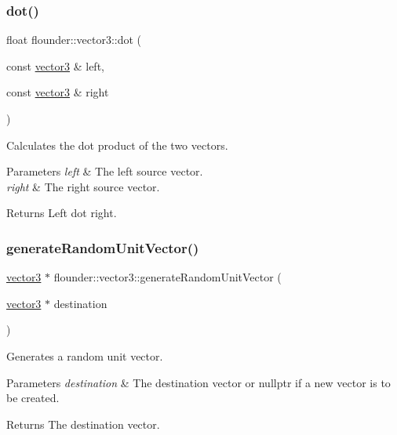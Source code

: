 \subsubsection{\texorpdfstring{dot()}{dot()}}
{\footnotesize\ttfamily float flounder\+::vector3\+::dot (\begin{DoxyParamCaption}\item[{const \hyperlink{classflounder_1_1vector3}{vector3} \&}]{left,  }\item[{const \hyperlink{classflounder_1_1vector3}{vector3} \&}]{right }\end{DoxyParamCaption})\hspace{0.3cm}{\ttfamily [static]}}



Calculates the dot product of the two vectors. 


\begin{DoxyParams}{Parameters}
{\em left} & The left source vector. \\
\hline
{\em right} & The right source vector. \\
\hline
\end{DoxyParams}
\begin{DoxyReturn}{Returns}
Left dot right. 
\end{DoxyReturn}
\mbox{\label{classflounder_1_1vector3_a6c8eeac56a831b4e3ca221e19f86031e}} 
\subsubsection{\texorpdfstring{generate\+Random\+Unit\+Vector()}{generateRandomUnitVector()}}
{\footnotesize\ttfamily \hyperlink{classflounder_1_1vector3}{vector3} $\ast$ flounder\+::vector3\+::generate\+Random\+Unit\+Vector (\begin{DoxyParamCaption}\item[{\hyperlink{classflounder_1_1vector3}{vector3} $\ast$}]{destination }\end{DoxyParamCaption})\hspace{0.3cm}{\ttfamily [static]}}



Generates a random unit vector. 


\begin{DoxyParams}{Parameters}
{\em destination} & The destination vector or nullptr if a new vector is to be created. \\
\hline
\end{DoxyParams}
\begin{DoxyReturn}{Returns}
The destination vector. 
\end{DoxyReturn}
\mbox{\label{classflounder_1_1vector3_a84374d3a1d99b2bcdcee65ade03e10c4}} 
